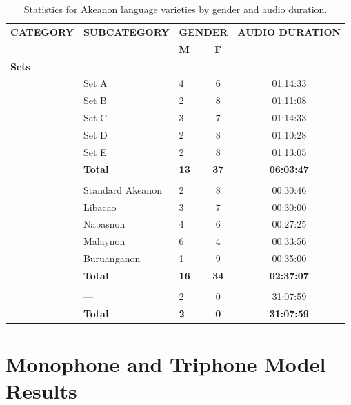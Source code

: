 \begin{table}[H]
	\centering
	\begin{adjustbox}{width=0.95\textwidth}
		\begin{tabular}{lllcc}
			\toprule
			\textbf{CATEGORY} & \textbf{SUBCATEGORY} & \multicolumn{2}{c}{\textbf{GENDER}} & \textbf{AUDIO DURATION} \\
			\cmidrule(lr){3-4}
			& & \textbf{M} & \textbf{F} & \\
			\midrule
			\multicolumn{5}{l}{\textbf{Sets}} \\
			& Set A & 4 & 6 & 01:14:33 \\
			& Set B & 2 & 8 & 01:11:08 \\
			& Set C & 3 & 7 & 01:14:33 \\
			& Set D & 2 & 8 & 01:10:28 \\
			& Set E & 2 & 8 & 01:13:05 \\
			\addlinespace
			& \textbf{Total} & \textbf{13} & \textbf{37} & \textbf{06:03:47} \\
			\addlinespace
			\multicolumn{5}{l}{\textbf{Dialects}} \\
			& Standard Akeanon & 2 & 8 & 00:30:46 \\
			& Libacao          & 3 & 7 & 00:30:00 \\
			& Nabasnon         & 4 & 6 & 00:27:25 \\
			& Malaynon         & 6 & 4 & 00:33:56 \\
			& Buruanganon      & 1 & 9 & 00:35:00 \\
			\addlinespace
			& \textbf{Total} & \textbf{16} & \textbf{34} & \textbf{02:37:07} \\
			\addlinespace
			\multicolumn{5}{l}{\textbf{Bible}} \\
			& — & 2 & 0 & 31:07:59 \\
			\addlinespace
			& \textbf{Total} & \textbf{2} & \textbf{0} & \textbf{31:07:59} \\
			\bottomrule
		\end{tabular}
	\end{adjustbox}
	\caption{Statistics for Akeanon language varieties by gender and audio duration.}
	\label{tab:bikolano_stats}
\end{table}




\section{Monophone and Triphone Model Results}

